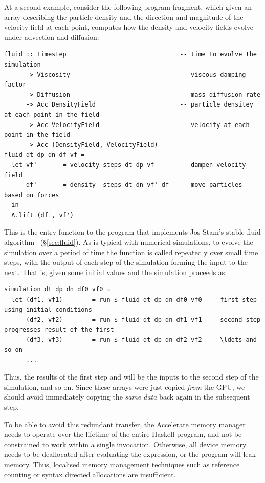 At a second example, consider the following program fragment, which given an
array describing the particle density  and the direction and magnitude
of the velocity field  at each point, computes how the density and
velocity fields evolve under advection and diffusion:
%
\begin{lstlisting}[style=haskell]
fluid :: Timestep                               -- time to evolve the simulation
      -> Viscosity                              -- viscous damping factor
      -> Diffusion                              -- mass diffusion rate
      -> Acc DensityField                       -- particle densitey at each point in the field
      -> Acc VelocityField                      -- velocity at each point in the field
      -> Acc (DensityField, VelocityField)
fluid dt dp dn df vf =
  let vf'       = velocity steps dt dp vf       -- dampen velocity field
      df'       = density  steps dt dn vf' df   -- move particles based on forces
  in
  A.lift (df', vf')
\end{lstlisting}
%
This is the entry function to the program that implements Jos Stam's stable
fluid algorithm~\cite{Stam:1999ey} (\S\ref{sec:fluid}). As is typical with
numerical simulations, to evolve the simulation over a period of time the
function is called repeatedly over small time steps, with the output of each
step of the simulation forming the input to the next. That is, given some
initial values  and  the simulation proceeds as:
%
\begin{lstlisting}[style=haskell]
simulation dt dp dn df0 vf0 =
  let (df1, vf1)        = run $ fluid dt dp dn df0 vf0  -- first step using initial conditions
      (df2, vf2)        = run $ fluid dt dp dn df1 vf1  -- second step progresses result of the first
      (df3, vf3)        = run $ fluid dt dp dn df2 vf2  -- \ldots and so on
      ...
\end{lstlisting}
%
Thus, the results of the first step  and  will be the inputs
to the second step of the simulation, and so on. Since these arrays were just
copied \emph{from} the GPU, we should avoid immediately copying the \emph{same
data} back again in the subsequent step.

To be able to avoid this redundant transfer, the Accelerate memory manager needs
to operate over the lifetime of the entire Haskell program, and not be
constrained to work within a single  invocation. Otherwise, all device
memory needs to be deallocated after evaluating the expression, or the program
will leak memory. Thus, localised memory management techniques such as reference
counting or syntax directed allocations are insufficient.

